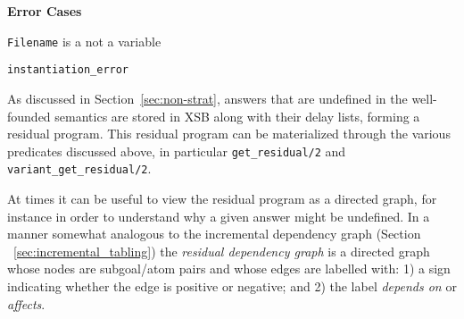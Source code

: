 \begin{description}
{\bf Error Cases}
\bi
\item {\tt Filename} is a not a variable
\bi
\item {\tt instantiation\_error}
\ei
\ei

%
As discussed in Section~\ref{sec:non-strat}, answers that are
undefined in the well-founded semantics are stored in XSB along with
their delay lists, forming a residual program.  This residual program
can be materialized through the various predicates discussed above, in
particular {\tt get\_residual/2} and {\tt variant\_get\_residual/2}.

At times it can be useful to view the residual program as a directed
graph, for instance in order to understand why a given answer might be
undefined.  In a manner somewhat analogous to the incremental
dependency graph (Section ~\ref{sec:incremental_tabling}) the {\em
  residual dependency graph} is a directed graph whose nodes are
subgoal/atom pairs and whose edges are labelled with: 1) a sign
indicating whether the edge is positive or negative; and 2) the label
{\em depends on} or {\em affects}.


\end{description}
